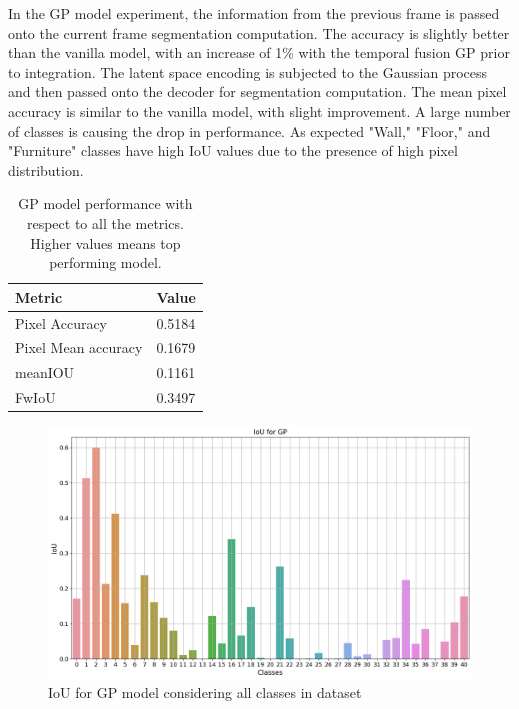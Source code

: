     In the GP model experiment, the information from the previous frame is passed onto the current frame segmentation computation. The accuracy is slightly better than the vanilla model, with an increase of 1\% with the temporal fusion GP prior to integration. The latent space encoding is subjected to the Gaussian process and then passed onto the decoder for segmentation computation. The mean pixel accuracy is similar to the vanilla model, with slight improvement. A large number of classes is causing the drop in performance. As expected "Wall," "Floor," and "Furniture" classes have high IoU values due to the presence of high pixel distribution. 
    
    \begin{table}
	\begin{center}
		\begin{tabular}{ | l | p{12cm} |}
			\hline
			
			\cellcolor{purple!30}Metric & \cellcolor{purple!30}Value \\ \hline
			Pixel Accuracy & 0.5184 \\ \hline
			Pixel Mean accuracy & 0.1679  \\ \hline
			meanIOU & 0.1161 \\ \hline
			FwIoU & 0.3497 \\ \hline
			\hline
		\end{tabular}
		\caption{GP model performance with respect to all the metrics. Higher values means top performing model.}
		\label{tab:caption}
	\end{center}
	\end{table}
	
	\begin{figure}
		\centering
		\includegraphics[width=13cm]{images/iou_gp_scannet_all_classes.png}
		\caption{IoU for GP model considering all classes in dataset}
		\label{fig:scannet_class}
	\end{figure} 

